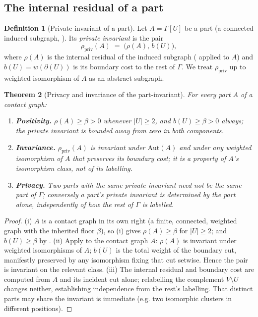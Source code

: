 \documentclass[11pt,a4paper]{article}
\theoremstyle{thmstyle}
\newtheorem{theorem}{Theorem}[section]
\theoremstyle{definition}
\newtheorem{definition}[theorem]{Definition}
\theoremstyle{remark}
\newcommand{\Gph}{\Gamma}                 %
\newcommand{\V}{V}                        %
\newcommand{\wt}{w}                       %
\newcommand{\floorc}{\beta}               %
\newcommand{\cut}{\partial}               %
\newcommand{\Agent}{A}                    %
\newcommand{\Res}{\rho}                   %
\newcommand{\abs}[1]{\lvert#1\rvert}
\begin{document}
\subsection{The internal residual of a part}

\begin{definition}[Private invariant of a part]
\label{def:private}
Let $\Agent=\Gph[U]$ be a part (a connected induced subgraph,
). Its \emph{private invariant} is the pair
\[
\Res_{\mathrm{priv}}(\Agent)\;=\;\bigl(\Res(\Agent),\,b(U)\bigr),
\]
where $\Res(\Agent)$ is the internal residual of the induced subgraph
\textup{(} applied to $\Agent$\textup{)} and $b(U)=\wt(\cut(U))$
is its boundary cost to the rest of $\Gph$. We treat $\Res_{\mathrm{priv}}$ up to
weighted isomorphism of $\Agent$ as an abstract subgraph.
\end{definition}

\begin{theorem}[Privacy and invariance of the part-invariant]
\label{thm:private}
For every part $\Agent$ of a contact graph:
\begin{enumerate}[label=\textup{(\roman*)},leftmargin=2.2em]
\item \textbf{Positivity.} $\Res(\Agent)\ge\floorc>0$ whenever $\abs{U}\ge2$,
and $b(U)\ge\floorc>0$ always; the private invariant is bounded away from zero in
both components.
\item \textbf{Invariance.} $\Res_{\mathrm{priv}}(\Agent)$ is invariant under
$\mathrm{Aut}(\Agent)$ and under any weighted isomorphism of $\Agent$ that
preserves its boundary cost; it is a property of $\Agent$'s isomorphism class,
not of its labelling.
\item \textbf{Privacy.} Two parts with the same private invariant need not be the
same part of $\Gph$; conversely a part's private invariant is determined by the
part alone, independently of how the rest of $\Gph$ is labelled.
\end{enumerate}
\end{theorem}

\begin{proof}
(i) $\Agent$ is a contact graph in its own right (a finite, connected, weighted
graph with the inherited floor $\floorc$), so (i) gives
$\Res(\Agent)\ge\floorc$ for $\abs{U}\ge2$; and $b(U)\ge\floorc$ by
. (ii) Apply  to the contact graph
$\Agent$: $\Res(\Agent)$ is invariant under weighted isomorphisms of $\Agent$;
$b(U)$ is the total weight of the boundary cut, manifestly preserved by any
isomorphism fixing that cut setwise. Hence the pair is invariant on the relevant
class. (iii) The internal residual and boundary cost are computed from $\Agent$
and its incident cut alone; relabelling the complement $\V\setminus U$ changes
neither, establishing independence from the rest's labelling. That distinct parts
may share the invariant is immediate (e.g. two isomorphic clusters in different
positions).
\end{proof}
\end{document}
